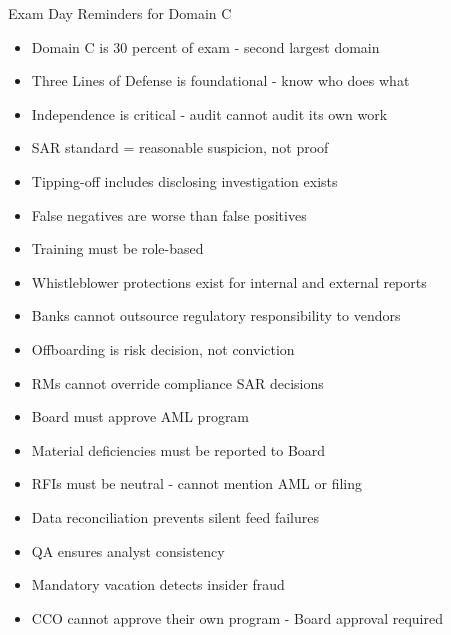 \documentclass[11pt,a4paper]{beamer}
\begin{document}
	\begin{frame}{Exam Day Reminders for Domain C}
		\begin{itemize}
			\item Domain C is 30 percent of exam - second largest domain
			\item Three Lines of Defense is foundational - know who does what
			\item Independence is critical - audit cannot audit its own work
			\item SAR standard = reasonable suspicion, not proof
			\item Tipping-off includes disclosing investigation exists
			\item False negatives are worse than false positives
			\item Training must be role-based
			\item Whistleblower protections exist for internal and external reports
			\item Banks cannot outsource regulatory responsibility to vendors
			\item Offboarding is risk decision, not conviction
			\item RMs cannot override compliance SAR decisions
			\item Board must approve AML program
			\item Material deficiencies must be reported to Board
			\item RFIs must be neutral - cannot mention AML or filing
			\item Data reconciliation prevents silent feed failures
			\item QA ensures analyst consistency
			\item Mandatory vacation detects insider fraud
			\item CCO cannot approve their own program - Board approval required
		\end{itemize}
	\end{frame}
	
\end{document}
